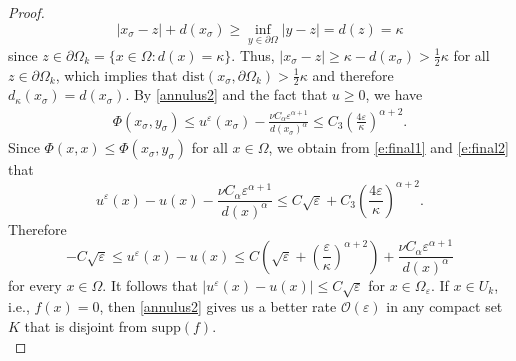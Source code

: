 \documentclass[12pt,reqno]{amsart}
\numberwithin{figure}{section}
\theoremstyle{plain}
\theoremstyle{remark}
\numberwithin{equation}{section}
\begin{document}
\begin{proof}
\begin{equation*}
    |x_\sigma - z| + d(x_\sigma) \geq \inf_{y\in \partial \Omega}|y-z| = d(z) = \kappa
\end{equation*}
since $z\in \partial\Omega_k = \{x \in \Omega: d(x) = \kappa\}$. Thus, $|x_\sigma - z| \geq \kappa - d(x_\sigma) > \frac{1}{2}\kappa$ for all $z\in \partial\Omega_k$, which implies that $\mathrm{dist}(x_\sigma,\partial\Omega_k)>\frac{1}{2}\kappa$ and therefore $d_\kappa(x_\sigma) = d(x_\sigma)$. By \eqref{annulus2} and the fact that $u \geq 0$, we have
\begin{align}
    \Phi(x_\sigma, y_\sigma)\leq u^\varepsilon(x_\sigma) - \frac{\nu C_\alpha \varepsilon^{\alpha+1}}{d(x_\sigma)^\alpha} \leq C_3\left(\frac{4\varepsilon}{\kappa}\right)^{\alpha+2} \label{e:final2}.
\end{align}
\noindent
Since $\Phi(x,x) \leq \Phi(x_\sigma,y_\sigma)$ for all $x\in \Omega$, we obtain from \eqref{e:final1} and \eqref{e:final2} that
\begin{equation*}
    u^\varepsilon(x)-u(x)-\frac{\nu C_\alpha  \varepsilon^{\alpha+1}}{d(x)^\alpha} \leq C\sqrt{\varepsilon} +C_3\left(\frac{4\varepsilon}{\kappa}\right)^{\alpha+2}.
\end{equation*}
Therefore
\begin{equation*}
   -C \sqrt{\varepsilon}\leq  u^\varepsilon(x) - u(x) \leq C\left(\sqrt{\varepsilon}+\left(\frac{\varepsilon}{\kappa}\right)^{\alpha+2}\right) + \frac{\nu C_\alpha  \varepsilon^{\alpha+1}}{d(x)^\alpha} 
\end{equation*}
for every $x\in \Omega$. It follows that $|u^\varepsilon(x)-u(x)| \leq C\sqrt{\varepsilon}$ for $x\in \Omega_\varepsilon$. 
If $x\in U_k$, i.e., $f(x) = 0$, then \eqref{annulus2} gives us a better rate $\mathcal{O}(\varepsilon)$ in any compact set $K$ that is disjoint from $\mathrm{supp}(f)$. \\


\end{proof}
\end{document}
